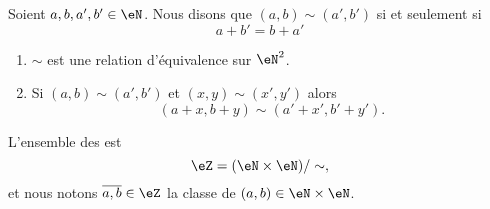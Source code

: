 \begin{propositionDef}     \label{PROPooFIKUooVHlvTt}
    Soient \( a,b,a',b'\in \eN\). Nous disons que \( (a,b)\sim(a',b')\) si et seulement si
    \begin{equation}
        a+b'=b+a'
    \end{equation}
    \begin{enumerate}
        \item
            \( \sim\) est une relation d'équivalence sur \( \eN^2\).
        \item       \label{ITEMooZQSHooSDfdvK}
            Si \( (a,b)\sim (a',b')\) et \( (x,y)\sim (x',y')\) alors
            \begin{equation}
                (a+x,b+y)\sim(a'+x',b'+y').
            \end{equation}
    \end{enumerate}
    L'ensemble des  est
    \begin{equation}
        \eZ=(\eN\times \eN)/\sim,
    \end{equation}
    et nous notons \( \overline{ a,b }\in \eZ\) la classe de \( (a,b)\in \eN\times \eN\).
\end{propositionDef}

